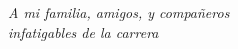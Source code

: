 %
\chapter*{}
\begin{flushright}
\textit{A mi familia, amigos, y compañeros} \\
\textit{infatigables de la carrera} \\
\end{flushright}

